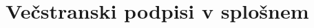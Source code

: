 \documentclass[isrm2, tisk]{fmfdelo}
\begin{document}
\section{Večstranski podpisi v splošnem}

%
%
%
\end{document}
